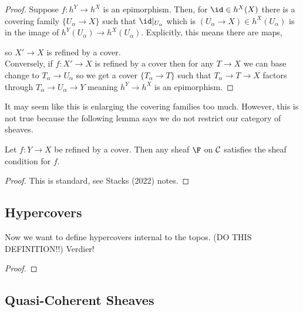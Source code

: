 \documentclass[12pt]{article}
\begin{document}
\begin{proof}
Suppose $f : h^Y \to h^X$ is an epimorphism. Then, for $\id \in h^X(X)$ there is a covering family $\{ U_\alpha \to X \}$ such that $\id|_{U_\alpha}$ which is $(U_\alpha \to X) \in h^X(U_\alpha)$ is in the image of $h^Y(U_\alpha) \to h^X(U_\alpha)$. Explicitly, this means there are maps,
\begin{center}
\end{center}
so $X' \to X$ is refined by a cover. 
\bigskip\\
Conversely, if $f : X' \to X$ is refined by a cover then for any $T \to X$ we can base change to $T_{\alpha} \to U_\alpha$ so we get a cover $\{ T_\alpha \to T \}$ such that $T_\alpha \to T \to X$ factors through $T_\alpha \to U_\alpha \to Y$ meaning $h^Y \to h^X$ is an epimorphism. 
\end{proof}

\begin{rmk}
It may seem like this is enlarging the covering families too much. However, this is not true because the following lemma says we do not restrict our category of sheaves.
\end{rmk}

\begin{lemma}
Let $f : Y \to X$ be refined by a cover. Then any sheaf $\F$ on $\mathcal{C}$ satisfies the sheaf condition for $f$.
\end{lemma}

\begin{proof}
This is standard, see Stacks (2022) notes.
\end{proof}

\subsection{Hypercovers}


Now we want to define hypercovers internal to the topos. (DO THIS DEFINITION!!) Verdier!

\begin{proof}

\end{proof}

\subsection{Quasi-Coherent Sheaves}
\end{document}

